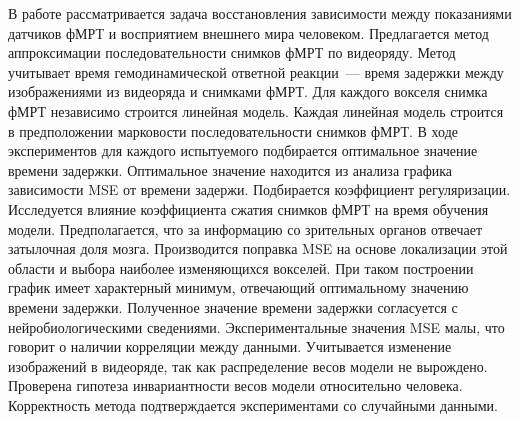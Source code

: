 \documentclass[a4paper, 12pt]{extarticle}
\begin{document}
В работе рассматривается задача восстановления зависимости между показаниями
датчиков фМРТ и восприятием внешнего мира человеком.
Предлагается метод аппроксимации последовательности снимков фМРТ по видеоряду. 
Метод учитывает время гемодинамической ответной реакции~--- время задержки между изображениями из видеоряда и снимками фМРТ. 
Для каждого вокселя снимка фМРТ независимо строится линейная модель. 
Каждая линейная модель строится в предположении марковости последовательности снимков фМРТ. 
В ходе экспериментов для каждого испытуемого подбирается оптимальное значение времени задержки. 
Оптимальное значение находится из анализа графика зависимости MSE от времени задержи.
Подбирается коэффициент регуляризации. 
Исследуется влияние коэффициента сжатия снимков фМРТ на время обучения модели.
Предполагается, что за информацию со зрительных органов отвечает затылочная доля мозга.
Производится поправка MSE на основе локализации этой области и выбора наиболее изменяющихся вокселей. 
При таком построении график имеет характерный минимум, отвечающий оптимальному значению времени задержки.
Полученное значение времени задержки согласуется с нейробиологическими сведениями.
Экспериментальные значения MSE малы, что говорит о наличии корреляции между данными. 
Учитывается изменение изображений в видеоряде, так как распределение весов модели не вырождено.
Проверена гипотеза инвариантности весов модели относительно человека. 
Корректность метода подтверждается экспериментами со случайными данными.

\newpage



\end{document}

